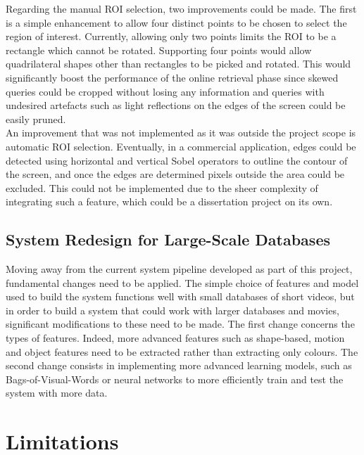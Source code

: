 Regarding the manual ROI selection, two improvements could be made. The first is a simple enhancement to allow four distinct points to be chosen to select the region of interest. Currently, allowing only two points limits the ROI to be a rectangle which cannot be rotated. Supporting four points would allow quadrilateral shapes other than rectangles to be picked and rotated. This would significantly boost the performance of the online retrieval phase since skewed queries could be cropped without losing any information and queries with undesired artefacts such as light reflections on the edges of the screen could be easily pruned.\\

An improvement that was not implemented as it was outside the project scope is automatic ROI selection. Eventually, in a commercial application, edges could be detected using horizontal and vertical Sobel operators to outline the contour of the screen, and once the edges are determined pixels outside the area could be excluded. This could not be implemented due to the sheer complexity of integrating such a feature, which could be a dissertation project on its own.

\subsection{System Redesign for Large-Scale Databases}

Moving away from the current system pipeline developed as part of this project, fundamental changes need to be applied. The simple choice of features and model used to build the system functions well with small databases of short videos, but in order to build a system that could work with larger databases and movies, significant modifications to these need to be made. The first change concerns the types of features. Indeed, more advanced features such as shape-based, motion and object features need to be extracted rather than extracting only colours. The second change consists in implementing more advanced learning models, such as Bags-of-Visual-Words or neural networks to more efficiently train and test the system with more data. 


\section{Limitations}
\label{sec:conclusions-limitations}

